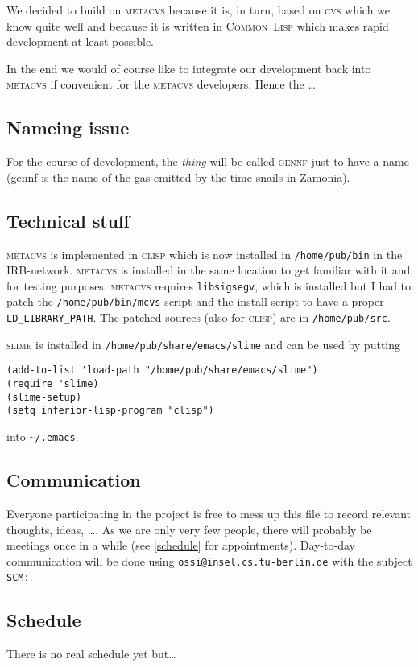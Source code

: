 \documentclass[german, 10pt, a4paper]{article}
\begin{document}
We decided to build on \textsc{metacvs} because it is, in turn, based on
\textsc{cvs} which we know quite well and because it is written in
\textsc{Common~Lisp} which makes rapid development at least possible.

In the end we would of course like to integrate our development back
into \textsc{metacvs} if convenient for the \textsc{metacvs} developers.
Hence the \ldots

\subsection{Nameing issue}
For the course of development, the \emph{thing} will be called
\textsc{gennf} just to have a name (gennf is the name of the gas emitted
by the time snails in Zamonia).

\subsection{Technical stuff}
\textsc{metacvs} is implemented in \textsc{clisp} which is now installed
in \texttt{/home/pub/bin} in the IRB-network. \textsc{metacvs} is
installed in the same location to get familiar with it and for testing
purposes. \textsc{metacvs} requires \texttt{libsigsegv}, which is
installed but I had to patch the \texttt{/home/pub/bin/mcvs}-script and
the install-script to have a proper \texttt{LD\_LIBRARY\_PATH}. The
patched sources (also for \textsc{clisp}) are in \texttt{/home/pub/src}.

\textsc{slime} is installed in \texttt{/home/pub/share/emacs/slime} and
can be used by putting
\begin{verbatim}
(add-to-list 'load-path "/home/pub/share/emacs/slime")
(require 'slime)
(slime-setup)
(setq inferior-lisp-program "clisp")
\end{verbatim}

into \texttt{\textasciitilde/.emacs}.

\subsection{Communication}
Everyone participating in the project is free to mess up this file to
record relevant thoughts, ideas, \ldots.
As we are only very few people, there will probably be meetings once in
a while (see \ref{schedule} for appointments).
Day-to-day communication will be done using
\texttt{ossi@insel.cs.tu-berlin.de} with the subject \texttt{SCM:}.
\subsection{Schedule \label{schedule}}
There is no real schedule yet but\ldots
\end{document}
